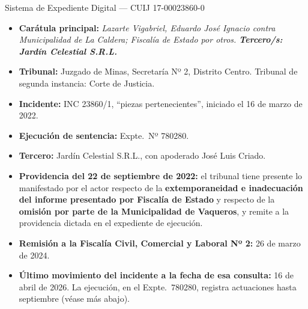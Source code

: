 \begin{ficha}{Sistema de Expediente Digital --- CUIJ 17-00023860-0}
\begin{itemize}[leftmargin=*,nosep]
\item \textbf{Carátula principal:} \textit{Lazarte Vigabriel, Eduardo José Ignacio contra Municipalidad de La Caldera; Fiscalía de Estado por otros. \textbf{Tercero/s: Jardín Celestial S.R.L.}}
\item \textbf{Tribunal:} Juzgado de Minas, Secretaría Nº 2, Distrito Centro. Tribunal de segunda instancia: Corte de Justicia.
\item \textbf{Incidente:} INC 23860/1, ``piezas pertenecientes'', iniciado el 16 de marzo de 2022.
\item \textbf{Ejecución de sentencia:} Expte.\ Nº 780280.
\item \textbf{Tercero:} Jardín Celestial S.R.L., con apoderado José Luis Criado.
\item \textbf{Providencia del 22 de septiembre de 2022:} el tribunal tiene presente lo manifestado por el actor respecto de la \textbf{extemporaneidad e inadecuación del informe presentado por Fiscalía de Estado} y respecto de la \textbf{omisión por parte de la Municipalidad de Vaqueros}, y remite a la providencia dictada en el expediente de ejecución.
\item \textbf{Remisión a la Fiscalía Civil, Comercial y Laboral Nº 2:} 26 de marzo de 2024.
\item \textbf{Último movimiento del incidente a la fecha de esa consulta:} 16 de abril de 2026. La ejecución, en el Expte.\ 780280, registra actuaciones hasta septiembre (véase más abajo).
\end{itemize}
\end{ficha}

